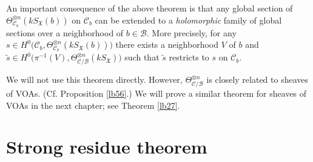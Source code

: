 \documentclass[12pt,b5paper,notitlepage]{report}
\theoremstyle{definition}
\theoremstyle{plain}
\newcommand{\fk}{\mathfrak}
\newcommand{\mc}{\mathcal}
\newcommand{\wtd}{\widetilde}
\newcommand{\SX}{S_{\fk X}}
\numberwithin{equation}{section}
\begin{document}
An important  consequence of the above theorem is that any global section  of $\Theta_{\mc C_b}^{\otimes n}(k\SX(b))$ on $\mc C_b$ can be extended to a \emph{holomorphic} family of global sections over a neighborhood of $b\in\mc B$. More precisely, for any $s\in H^0\big(\mc C_b,\Theta_{\mc C_b}^{\otimes n}(k\SX(b))\big)$ there exists a neighborhood $V$ of $b$ and $\wtd s\in H^0\big(\pi^{-1}(V),\Theta_{\mc C/\mc B}^{\otimes n}(k\SX)\big)$ such that $\wtd s$ restricts to $s$ on $\mc C_b$. 

We will not use this theorem directly. However,  $\Theta_{\mc C/\mc B}^{\otimes n}$ is closely related to sheaves of VOAs. (Cf. Proposition \ref{lb56}.) We will prove a similar theorem for sheaves of VOAs in the next chapter; see Theorem \ref{lb27}.

\section{Strong residue theorem}
\end{document}
